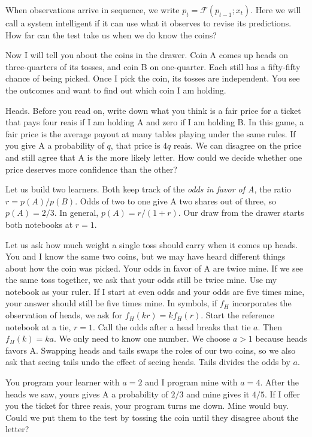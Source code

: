 When observations arrive in sequence, we write $p_t=\mathcal F(p_{t-1};x_t)$. Here we will call a system intelligent if it can use what it observes to revise its predictions. How far can the test take us when we do know the coins?

Now I will tell you about the coins in the drawer. Coin A comes up heads on three-quarters of its tosses, and coin B on one-quarter. Each still has a fifty-fifty chance of being picked. Once I pick the coin, its tosses are independent. You see the outcomes and want to find out which coin I am holding.

Heads. Before you read on, write down what you think is a fair price for a ticket that pays four reais if I am holding A and zero if I am holding B. In this game, a fair price is the average payout at many tables playing under the same rules. If you give A a probability of \(q\), that price is \(4q\) reais. We can disagree on the price and still agree that A is the more likely letter. How could we decide whether one price deserves more confidence than the other?

Let us build two learners. Both keep track of the \emph{odds in favor of A}, the ratio \(r=p(A)/p(B)\). Odds of two to one give A two shares out of three, so \(p(A)=2/3\). In general, \(p(A)=r/(1+r)\). Our draw from the drawer starts both notebooks at \(r=1\).

Let us ask how much weight a single toss should carry when it comes up heads. You and I know the same two coins, but we may have heard different things about how the coin was picked. Your odds in favor of A are twice mine. If we see the same toss together, we ask that your odds still be twice mine. Use my notebook as your ruler. If I start at even odds and your odds are five times mine, your answer should still be five times mine. In symbols, if $f_H$ incorporates the observation of heads, we ask for $f_H(kr)=kf_H(r)$. Start the reference notebook at a tie, $r=1$. Call the odds after a head breaks that tie $a$. Then $f_H(k)=ka$. We only need to know one number. We choose \(a>1\) because heads favors A. Swapping heads and tails swaps the roles of our two coins, so we also ask that seeing tails undo the effect of seeing heads. Tails divides the odds by \(a\).

You program your learner with \(a=2\) and I program mine with \(a=4\). After the heads we saw, yours gives A a probability of \(2/3\) and mine gives it \(4/5\). If I offer you the ticket for three reais, your program turns me down. Mine would buy. Could we put them to the test by tossing the coin until they disagree about the letter?

